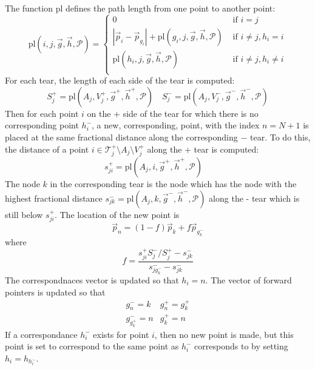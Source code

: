 \documentclass{article}
\begin{document}
The function $\mathrm{pl}$ defines the path length from one point to another
point:
\begin{displaymath}
  \mathrm{pl}(i, j, \vec{g}, \vec{h}, \mathcal{P}) = \left\{ 
    \begin{array}{ll}
      0 & \mbox{ if } i = j \\
      |\vec{p}_i-\vec{p}_{g_i}| + \mathrm{pl}(g_i, j, \vec{g}, \vec{h}, \mathcal{P}) & \mbox{ if } i \ne j, h_i=i \\
      \mathrm{pl}(h_i, j, \vec{g}, \vec{h}, \mathcal{P})    & \mbox{ if } i \ne j, h_i\ne i \\
    \end{array}\right.
\end{displaymath}
For each tear, the length of each side of the tear is computed:
\begin{displaymath}
  S^+_j = \mathrm{pl}(A_j, V^+_j, \vec{g}^+, \vec{h}^+, \mathcal{P}) \quad 
  S^-_j = \mathrm{pl}(A_j, V^-_j, \vec{g}^-, \vec{h}^-, \mathcal{P})
\end{displaymath}
Then for each point $i$ on the $+$ side of the tear for which there is
no corresponding point $h_i^-$, a new, corresponding, point, with the
index $n=N+1$ is placed at the same fractional distance along the
corresponding $-$ tear. To do this, the distance of a point
$i\in{\mathcal{T}^+_j}\setminus A_j \setminus V^+_j$ along the + tear
is computed:
\begin{displaymath}
  s^+_{ji} = \mathrm{pl}(A_j, i, \vec{g}^+, \vec{h}^+, \mathcal{P}) \quad 
\end{displaymath}
The node $k$ in the corresponding tear is the node which has the node
with the highest fractional distance $s^-_{jk}=\mathrm{pl}(A_j, k,
\vec{g}^-, \vec{h}^-, \mathcal{P})$ along the - tear which is still below
$s^+_{ji}$. The location of the new point is
\begin{displaymath}
  \vec{p}_n = (1-f)\vec{p}_k + f\vec{p}_{g^-_k}
\end{displaymath}
where
\begin{displaymath}
  f = \frac{s^+_{ji}S^-_j/S^+_j-s^-_{jk}}{s^-_{jg^-_k}-s^-_{jk}}
\end{displaymath}
The correspondnaces vector is updated so that $h_i = n$. The vector of
forward pointers is updated so that
\begin{displaymath}
  \begin{array}{ll}
    g^-_n = k     & g^+_n = g^+_k \\
    g^-_{g^+_k} = n & g^+_k = n 
  \end{array}
\end{displaymath}
If a correspondance $h^-_i$ exists for point $i$, then no new point is
made, but this point is set to correspond to the same point as $h^-_i$
corresponds to by setting $h_i = h_{h^-_i}$.
\end{document}
